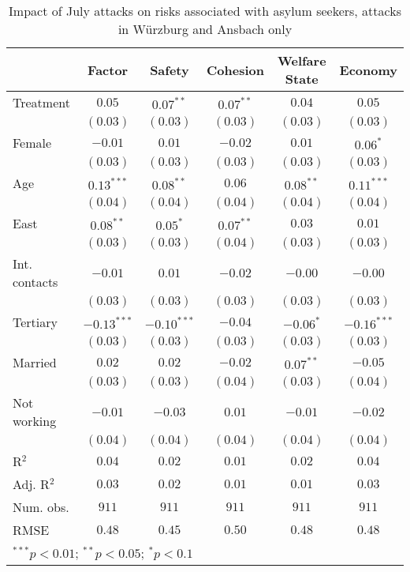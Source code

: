 
\begin{table}
\caption{Impact of July attacks on risks associated with asylum seekers, attacks in Würzburg and Ansbach only}
\begin{center}
\begin{tabular}{l c c c c c}
\toprule
 & Factor & Safety & Cohesion & Welfare State & Economy \\
\midrule
Treatment     & $0.05$        & $0.07^{**}$   & $0.07^{**}$ & $0.04$      & $0.05$        \\
              & $(0.03)$      & $(0.03)$      & $(0.03)$    & $(0.03)$    & $(0.03)$      \\
Female        & $-0.01$       & $0.01$        & $-0.02$     & $0.01$      & $0.06^{*}$    \\
              & $(0.03)$      & $(0.03)$      & $(0.03)$    & $(0.03)$    & $(0.03)$      \\
Age           & $0.13^{***}$  & $0.08^{**}$   & $0.06$      & $0.08^{**}$ & $0.11^{***}$  \\
              & $(0.04)$      & $(0.04)$      & $(0.04)$    & $(0.04)$    & $(0.04)$      \\
East          & $0.08^{**}$   & $0.05^{*}$    & $0.07^{**}$ & $0.03$      & $0.01$        \\
              & $(0.03)$      & $(0.03)$      & $(0.04)$    & $(0.03)$    & $(0.03)$      \\
Int. contacts & $-0.01$       & $0.01$        & $-0.02$     & $-0.00$     & $-0.00$       \\
              & $(0.03)$      & $(0.03)$      & $(0.03)$    & $(0.03)$    & $(0.03)$      \\
Tertiary      & $-0.13^{***}$ & $-0.10^{***}$ & $-0.04$     & $-0.06^{*}$ & $-0.16^{***}$ \\
              & $(0.03)$      & $(0.03)$      & $(0.03)$    & $(0.03)$    & $(0.03)$      \\
Married       & $0.02$        & $0.02$        & $-0.02$     & $0.07^{**}$ & $-0.05$       \\
              & $(0.03)$      & $(0.03)$      & $(0.04)$    & $(0.03)$    & $(0.04)$      \\
Not working   & $-0.01$       & $-0.03$       & $0.01$      & $-0.01$     & $-0.02$       \\
              & $(0.04)$      & $(0.04)$      & $(0.04)$    & $(0.04)$    & $(0.04)$      \\
\midrule
R$^2$         & $0.04$        & $0.02$        & $0.01$      & $0.02$      & $0.04$        \\
Adj. R$^2$    & $0.03$        & $0.02$        & $0.01$      & $0.01$      & $0.03$        \\
Num. obs.     & $911$         & $911$         & $911$       & $911$       & $911$         \\
RMSE          & $0.48$        & $0.45$        & $0.50$      & $0.48$      & $0.48$        \\
\bottomrule
\multicolumn{6}{l}{\scriptsize{$^{***}p<0.01$; $^{**}p<0.05$; $^{*}p<0.1$}}
\end{tabular}
\label{tab_risk_no_nice}
\end{center}
\end{table}
